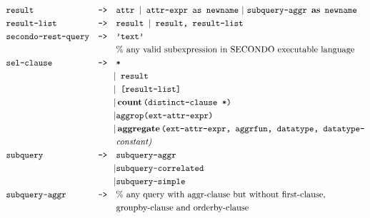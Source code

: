 \begin{align*}
&\texttt{result}&\texttt{-->}\quad &\texttt{attr }	|\texttt{ attr-expr as newname}\ |\ \texttt{subquery-aggr}\ \operatorname{\textbf{as}}\ \texttt{newname}	\\
&\texttt{result-list}&\texttt{-->}\quad &\texttt{result }	|\texttt{ result, result-list}								\\
&\texttt{secondo-rest-query}&\texttt{-->}\quad &\texttt{'text'} \\
&&&\text{\% any valid subexpression in SECONDO executable language}									\\
&\texttt{sel-clause}&\texttt{-->}\quad &\texttt{*}	\\
&&|&\texttt{ result }	\\
&&|&\texttt{ [result-list] }	\\
&&|&\operatorname{\textbf{count}}\texttt{(distinct-clause *)}	\\
&&|&\texttt{aggrop(ext-attr-expr) }	\\
&&|&\operatorname{\textbf{aggregate}}\texttt{(ext-attr-expr, aggrfun, datatype, datatype-}\\
&&&\textit{constant)}				\\
&\texttt{subquery}&\texttt{-->}\quad &\texttt{subquery-aggr}\\
&&|&\texttt{subquery-correlated} \\
&&|&\texttt{subquery-simple}\\
&\texttt{subquery-aggr}&\texttt{-->}\quad &\text{\% any query with aggr-clause but without first-clause, }\\
&&&\text{groupby-clause and orderby-clause}\\
\end{align*}

